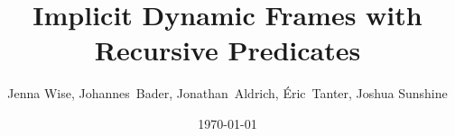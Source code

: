 \documentclass {llncs}
\begin{document}
\title{Implicit Dynamic Frames with Recursive Predicates}
\author{Jenna Wise,
	Johannes~Bader,
    Jonathan~Aldrich,
    {\'E}ric~Tanter,
    Joshua Sunshine}
\date{\today}

\maketitle

\nocite{summers2013formal}
%
%
%
%
%
%
%
% 
%
%
\end{document}
